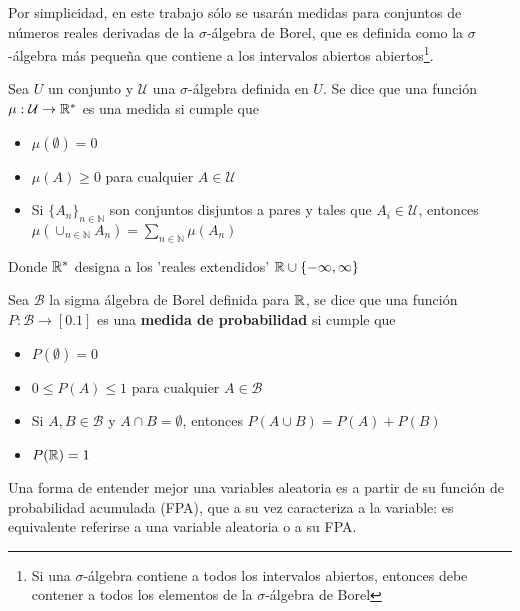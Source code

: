 Por simplicidad, en este trabajo sólo se usarán medidas para conjuntos de números reales derivadas 
de la $\sigma$-álgebra de Borel, que es definida como la $\sigma$-álgebra más pequeña que contiene a 
los intervalos abiertos abiertos\footnote{Si una $\sigma$-álgebra contiene a todos los
intervalos abiertos, entonces debe contener a todos los elementos de la $\sigma$-álgebra de Borel}.

\begin{defn}[Medida]
Sea $U$ un conjunto y $\mathcal{U}$ una $\sigma$-álgebra definida en $U$. Se dice que una función
$\mu : \mathcal{U} \rightarrow \mathbb{R}^{*}$ es una medida si cumple que
\begin{itemize}
\item $\mu(\emptyset) = 0$
\item $\mu(A) \geq 0$ para cualquier $A \in \mathcal{U}$
\item Si $\{ A_n \}_{n\in \mathbb{N}}$ son conjuntos disjuntos a pares y tales que 
$A_i \in \mathcal{U}$, entonces 
$\displaystyle \mu\left( \cup_{n\in \mathbb{N}} A_n \right) = \sum_{n\in \mathbb{N}} \mu(A_n)$
\end{itemize}
Donde $\mathbb{R}^{*}$ designa a los 'reales extendidos' $\mathbb{R} \cup \{-\infty,\infty \}$
\end{defn}

\begin{defn}
Sea $\mathcal{B}$ la sigma álgebra de Borel definida para $\mathbb{R}$, se dice que una función
$P : \mathcal{B} \rightarrow [0.1]$ es una \textbf{medida de probabilidad} si cumple que
\begin{itemize}
\item $P(\emptyset) = 0$
\item $0 \leq P(A) \leq 1$ para cualquier $A \in \mathcal{B}$
\item Si $A, B \in \mathcal{B}$ y $A\cap B = \emptyset$, entonces $P(A \cup B) = P(A) + P(B)$ 
\item $P(\mathbb{R}) = 1$
\end{itemize}
\label{variable_aleatoria}
\end{defn}


Una forma de entender mejor una variables aleatoria es a partir de su función de probabilidad
acumulada (FPA), que a su vez caracteriza a la variable: es equivalente referirse
a una variable aleatoria o a su FPA.

